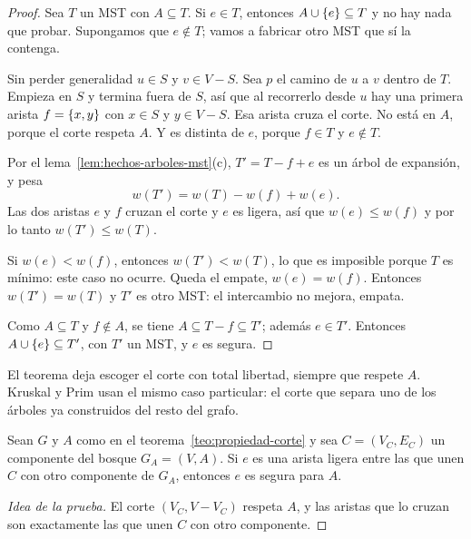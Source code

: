 \documentclass[11pt,letterpaper]{article}
\begin{document}
\begin{proof}
  Sea $T$ un MST con $A \subseteq T$. Si $e \in T$, entonces
  $A \cup \left\{ e \right\} \subseteq T$ y no hay nada que probar. Supongamos
  que $e \notin T$; vamos a fabricar otro MST que sí la contenga.

   Sin perder generalidad
  $u \in S$ y $v \in V - S$. Sea $p$ el camino de $u$ a $v$ dentro de
  $T$. Empieza en $S$ y termina fuera de $S$, así que al recorrerlo
  desde $u$ hay una primera arista $f = \left\{ x, y \right\}$ con $x \in S$ y
  $y \in V - S$. Esa arista cruza el corte. No está en $A$, porque el
  corte respeta $A$. Y es distinta de $e$, porque $f \in T$ y
  $e \notin T$.

   Por el lema~\ref{lem:hechos-arboles-mst}(c),
  $T' = T - f + e$ es un árbol de expansión, y pesa
  \[
    w(T') = w(T) - w(f) + w(e) .
  \]
  Las dos aristas $e$ y $f$ cruzan el corte y $e$ es ligera, así que
  $w(e) \le w(f)$ y por lo tanto $w(T') \le w(T)$.

   Si $w(e) < w(f)$, entonces $w(T') < w(T)$, lo
  que es imposible porque $T$ es mínimo: este caso no ocurre. Queda
  el empate, $w(e) = w(f)$. Entonces $w(T') = w(T)$ y $T'$ es otro
  MST: el intercambio no mejora, empata.

   Como $A \subseteq T$ y
  $f \notin A$, se tiene $A \subseteq T - f \subseteq T'$; además
  $e \in T'$. Entonces $A \cup \left\{ e \right\} \subseteq T'$, con $T'$ un MST,
  y $e$ es segura.
\end{proof}

El teorema deja escoger el corte con total libertad, siempre que
respete $A$. Kruskal y Prim usan el mismo caso particular: el corte
que separa uno de los árboles ya construidos del resto del grafo.

\begin{corolario}
  \label{cor:mst-componente}
  Sean $G$ y $A$ como en el teorema~\ref{teo:propiedad-corte} y sea
  $C = (V_C, E_C)$ un componente del bosque $G_A = (V, A)$. Si $e$ es
  una arista ligera entre las que unen $C$ con otro componente de
  $G_A$, entonces $e$ es segura para $A$.
\end{corolario}

\begin{proof}[Idea de la prueba]
  El corte $(V_C, V - V_C)$ respeta $A$, y las aristas que lo cruzan
  son exactamente las que unen $C$ con otro componente.
\end{proof}
\end{document}
